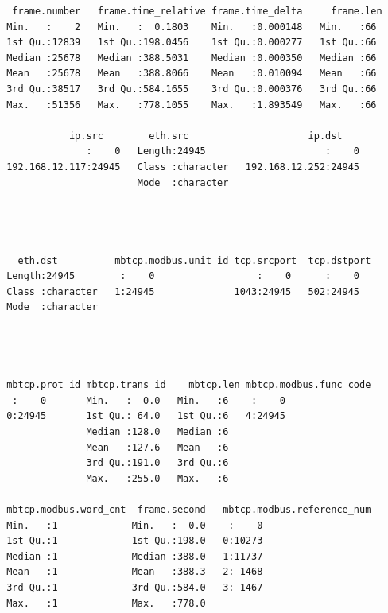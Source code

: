 \documentclass[12pt,]{article}
\begin{document}
\begin{verbatim}
  frame.number   frame.time_relative frame.time_delta     frame.len 
 Min.   :    2   Min.   :  0.1803    Min.   :0.000148   Min.   :66  
 1st Qu.:12839   1st Qu.:198.0456    1st Qu.:0.000277   1st Qu.:66  
 Median :25678   Median :388.5031    Median :0.000350   Median :66  
 Mean   :25678   Mean   :388.8066    Mean   :0.010094   Mean   :66  
 3rd Qu.:38517   3rd Qu.:584.1655    3rd Qu.:0.000376   3rd Qu.:66  
 Max.   :51356   Max.   :778.1055    Max.   :1.893549   Max.   :66  
                                                                    
            ip.src        eth.src                     ip.dst     
               :    0   Length:24945                     :    0  
 192.168.12.117:24945   Class :character   192.168.12.252:24945  
                        Mode  :character                         
                                                                 
                                                                 
                                                                 
                                                                 
   eth.dst          mbtcp.modbus.unit_id tcp.srcport  tcp.dstport
 Length:24945        :    0                  :    0      :    0  
 Class :character   1:24945              1043:24945   502:24945  
 Mode  :character                                                
                                                                 
                                                                 
                                                                 
                                                                 
 mbtcp.prot_id mbtcp.trans_id    mbtcp.len mbtcp.modbus.func_code
  :    0       Min.   :  0.0   Min.   :6    :    0               
 0:24945       1st Qu.: 64.0   1st Qu.:6   4:24945               
               Median :128.0   Median :6                         
               Mean   :127.6   Mean   :6                         
               3rd Qu.:191.0   3rd Qu.:6                         
               Max.   :255.0   Max.   :6                         
                                                                 
 mbtcp.modbus.word_cnt  frame.second   mbtcp.modbus.reference_num
 Min.   :1             Min.   :  0.0    :    0                   
 1st Qu.:1             1st Qu.:198.0   0:10273                   
 Median :1             Median :388.0   1:11737                   
 Mean   :1             Mean   :388.3   2: 1468                   
 3rd Qu.:1             3rd Qu.:584.0   3: 1467                   
 Max.   :1             Max.   :778.0                             
                                                                 

\end{verbatim}
\end{document}
